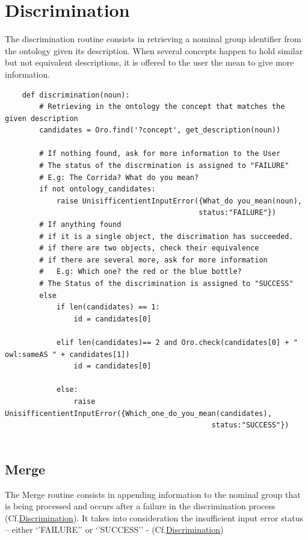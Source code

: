 \documentclass[twoside,a4paper,10pt]{report}
\newcommand{\dokutitleleveltwo}[1]{\chapter{#1}}
\newcommand{\dokutitleleveltree}[1]{\section{#1}}
\begin{document}
\dokutitleleveltwo{Discrimination}
\label{974418acf6ac4871b739b9591436865a}%

The discrimination routine consists in retrieving a nominal group identifier from the ontology given its description. 
When several concepts happen to hold similar but not equivalent descriptions, it is offered to the user the mean to give more information.


\lstset{language=python}
\begin{lstlisting}
    def discrimination(noun):
        # Retrieving in the ontology the concept that matches the given description
        candidates = Oro.find('?concept', get_description(noun))
        
        # If nothing found, ask for more information to the User
        # The status of the discrmination is assigned to "FAILURE"
        # E.g: The Corrida? What do you mean?
        if not ontology_candidates:
            raise UnisifficentientInputError({What_do you_mean(noun), 
                                             status:"FAILURE"})
        # If anything found
        # if it is a single object, the discrimation has succeeded. 
        # if there are two objects, check their equivalence
        # if there are several more, ask for more information
        #   E.g: Which one? the red or the blue bottle?
        # The Status of the discrimination is assigned to "SUCCESS" 
        else
            if len(candidates) == 1:
                id = candidates[0]
                
            elif len(candidates)== 2 and Oro.check(candidates[0] + " owl:sameAS " + candidates[1])
                id = candidates[0]
                
            else:
                raise UnisifficentientInputError({Which_one_do_you_mean(candidates), 
                                                status:"SUCCESS"})
                

\end{lstlisting}

\dokutitleleveltree{Merge}
\label{65464c31b2e6ac04da1fcaa37c9bd9c7}%

The Merge routine consists in appending information to the nominal group that is being processed and occurs after a failure in the discrimination process (Cf.\hyperref[974418acf6ac4871b739b9591436865a]{Discrimination}).
It takes into consideration the insufficient input error status – either ‘’FAILURE’’ or ‘’SUCCESS’’ - (Cf.\hyperref[974418acf6ac4871b739b9591436865a]{Discrimination})
\end{document}
